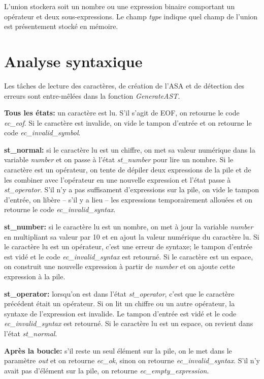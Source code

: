 \documentclass[10pt]{report}
\begin{document}
L'union stockera soit un nombre ou une expression binaire comportant
un opérateur et deux sous-expressions.  Le champ \emph{type} indique
quel champ de l'union est présentement stocké en mémoire.


\newpage

\section{Analyse syntaxique}

Les tâches de lecture des caractères, de création de l'ASA et de
détection des erreurs sont entre-mêlées dans la fonction
\emph{GenerateAST}.

\textbf{Tous les états:} un caractère est lu.  S'il s'agit de EOF, on
retourne le code \emph{ec\_eof}.  Si le caractère est invalide, on
vide le tampon d'entrée et on retourne le code
\emph{ec\_invalid\_symbol}.

\textbf{st\_normal:} si le caractère lu est un chiffre, on met sa
valeur numérique dans la variable \emph{number} et on passe à l'état
\emph{st\_number} pour lire un nombre.  Si le caractère est un
opérateur, on tente de dépiler deux expressions de la pile et de les
combiner avec l'opérateur en une nouvelle expression et l'état passe à
\emph{st\_operator}.  S'il n'y a pas suffisament d'expressions sur la
pile, on vide le tampon d'entrée, on libère -- s'il y a lieu -- les
expressions temporairement allouées et on retourne le code
\emph{ec\_invalid\_syntax}.

\textbf{st\_number:} si le caractère lu est un nombre, on met à jour
la variable \emph{number} en multipliant sa valeur par 10 et en ajout
la valeur numérique du caractère lu.  Si le caractère lu est un
opérateur, c'est une erreur de syntaxe; le tampon d'entrée est vidé et
le code \emph{ec\_invalid\_syntax} est retourné.  Si le caractère est
un espace, on construit une nouvelle expression à partir de
\emph{number} et on ajoute cette expression à la pile.

\textbf{st\_operator:} lorsqu'on est dans l'état \emph{st\_operator},
c'est que le caractère précédent était un opérateur.  Si on lit un
chiffre ou un autre opérateur, la syntaxe de l'expression est
invalide.  Le tampon d'entrée est vidé et le code
\emph{ec\_invalid\_syntax} est retourné.  Si le caractère lu est un
espace, on revient dans l'état \emph{st\_normal}.

\textbf{Après la boucle:} s'il reste un seul élément sur la pile, on
le met dans le paramètre \emph{out} et on retourne \emph{ec\_ok},
sinon on retourne \emph{ec\_invalid\_syntax}.  S'il n'y avait pas
d'élément sur la pile, on retourne \emph{ec\_empty\_expression}.
\end{document}
